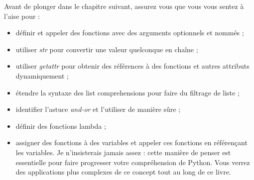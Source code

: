 Avant de plonger dans le chapitre suivant, assurez vous que vous vous sentez à l’aise pour :

\begin{itemize}
    \item définir et appeler des fonctions avec des arguments optionnels et nommés ;
    \item utiliser \emph{str} pour convertir une valeur quelconque en chaîne ;
    \item utiliser \emph{getattr} pour obtenir des références à des fonctions et autres attributs dynamiquement ;
    \item étendre la syntaxe des list comprehensions pour faire du filtrage de liste ;
    \item identifier l’astuce \emph{and-or} et l’utiliser de manière sûre ;
    \item définir des fonctions lambda ;
    \item assigner des fonctions à des variables et appeler ces fonctions en référençant les variables. Je n’insisterais jamais assez : cette manière de penser est essentielle pour faire progresser votre compréhension de Python. Vous verrez des applications plus complexes de ce concept tout au long de ce livre.
\end{itemize}
